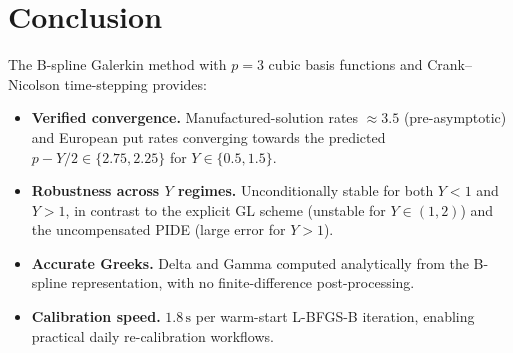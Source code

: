 \documentclass[11pt,a4paper]{article}
\begin{document}
\label{sec:calibration_note}

\section{Conclusion}

The B-spline Galerkin method with $p=3$ cubic basis functions and
Crank--Nicolson time-stepping provides:
\begin{itemize}
  \item \textbf{Verified convergence.}
        Manufactured-solution rates $\approx 3.5$ (pre-asymptotic) and
        European put rates converging towards the predicted
        $p - Y/2 \in \{2.75, 2.25\}$ for $Y\in\{0.5,1.5\}$.
  \item \textbf{Robustness across $Y$ regimes.}
        Unconditionally stable for both $Y<1$ and $Y>1$, in contrast to the
        explicit GL scheme (unstable for $Y\in(1,2)$) and the uncompensated
        PIDE (large error for $Y>1$).
  \item \textbf{Accurate Greeks.}
        Delta and Gamma computed analytically from the B-spline representation,
        with no finite-difference post-processing.
  \item \textbf{Calibration speed.}
        $1.8\,\mathrm{s}$ per warm-start L-BFGS-B iteration, enabling
        practical daily re-calibration workflows.
\end{itemize}
\end{document}
